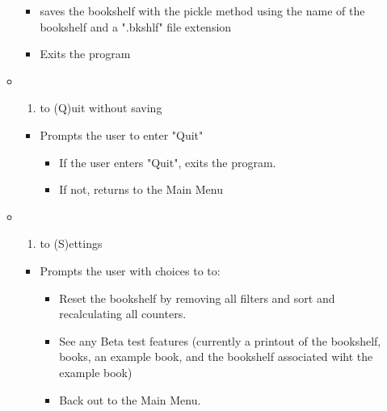 \documentclass[11pt]{article}
\providecommand{\tightlist}{%
      \setlength{\itemsep}{0pt}\setlength{\parskip}{0pt}}
\begin{document}
\begin{enumerate}
\begin{itemize}
    \begin{itemize}
    \tightlist
    \item
      saves the bookshelf with the pickle method using the name of the
      bookshelf and a ".bkshlf" file extension
    \item
      Exits the program
    \end{itemize}
  \item
    \begin{enumerate}
    \def\labelenumii{(\Alph{enumii})}
    \setcounter{enumii}{16}
    \tightlist
    \item
      to (Q)uit without saving
    \end{enumerate}

    \begin{itemize}
    \tightlist
    \item
      Prompts the user to enter "Quit"

      \begin{itemize}
      \tightlist
      \item
        If the user enters "Quit", exits the program.
      \item
        If not, returns to the Main Menu
      \end{itemize}
    \end{itemize}
  \item
    \begin{enumerate}
    \def\labelenumii{(\Alph{enumii})}
    \setcounter{enumii}{18}
    \tightlist
    \item
      to (S)ettings
    \end{enumerate}

    \begin{itemize}
    \tightlist
    \item
      Prompts the user with choices to to:

      \begin{itemize}
      \tightlist
      \item
        Reset the bookshelf by removing all filters and sort and
        recalculating all counters.
      \item
        See any Beta test features (currently a printout of the
        bookshelf, books, an example book, and the bookshelf associated
        wiht the example book)
      \item
        Back out to the Main Menu.
      \end{itemize}
    \end{itemize}
  \end{itemize}
\end{enumerate}
\end{document}
